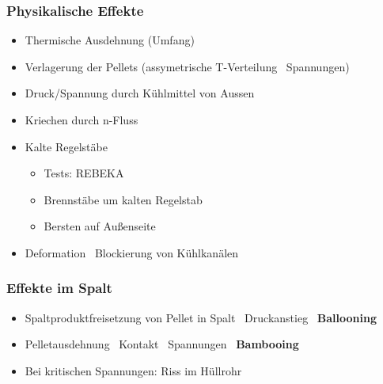 \documentclass[12pt]{article}
\begin{document}
\subsubsection{Physikalische Effekte}
\begin{itemize}
	\item Thermische Ausdehnung (Umfang)
	\item Verlagerung der Pellets (assymetrische T-Verteilung \textrightarrow\ Spannungen)
	\item Druck/Spannung durch Kühlmittel von Aussen
	\item Kriechen durch n-Fluss
	\item Kalte Regelstäbe
		\begin{itemize}
			\item Tests: REBEKA
			\item Brennstäbe um kalten Regelstab
			\item Bersten auf Außenseite
		\end{itemize}
	\item Deformation \textrightarrow\ Blockierung von Kühlkanälen
\end{itemize}

\subsubsection{Effekte im Spalt}
\begin{itemize}
	\item Spaltproduktfreisetzung von Pellet in Spalt \textrightarrow\ Druckanstieg \textrightarrow\ \textbf{Ballooning}
	\item Pelletausdehnung \textrightarrow\ Kontakt \textrightarrow\ Spannungen \textrightarrow\ \textbf{Bambooing}
	\item Bei kritischen Spannungen: Riss im Hüllrohr
\end{itemize}
\end{document}
